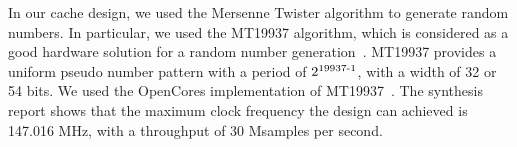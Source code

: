In our cache design, we used the Mersenne Twister algorithm to
generate random numbers. In particular, we used the MT19937 algorithm,
which is considered as a good hardware solution for a random number
generation~\cite{Matsumoto:1998:MTE:272991.272995}. MT19937 provides a
uniform pseudo number pattern with a period of
$2\textsuperscript{19937-1}$, with a width of 32 or 54 bits.  We used
the OpenCores implementation of MT19937~\cite{OpenCores}. The
synthesis report shows that the maximum clock frequency the design can
achieved is 147.016 MHz, with a throughput of 30 Msamples per second.

%
%
%
%








%

